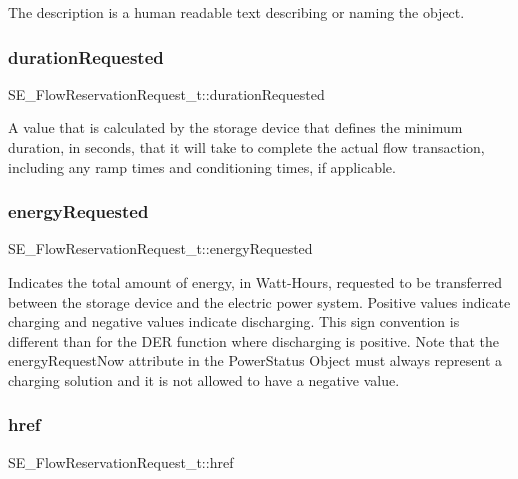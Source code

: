 The description is a human readable text describing or naming the object. \mbox{\label{group__FlowReservationRequest_gae84ba3c66b07ed3f5b9e567893c0796a}} 
\subsubsection{\texorpdfstring{duration\+Requested}{durationRequested}}
{\footnotesize\ttfamily S\+E\+\_\+\+Flow\+Reservation\+Request\+\_\+t\+::duration\+Requested}

A value that is calculated by the storage device that defines the minimum duration, in seconds, that it will take to complete the actual flow transaction, including any ramp times and conditioning times, if applicable. \mbox{\label{group__FlowReservationRequest_ga02b7ef2f402468e92c66728984b2b0c8}} 
\subsubsection{\texorpdfstring{energy\+Requested}{energyRequested}}
{\footnotesize\ttfamily S\+E\+\_\+\+Flow\+Reservation\+Request\+\_\+t\+::energy\+Requested}

Indicates the total amount of energy, in Watt-\/\+Hours, requested to be transferred between the storage device and the electric power system. Positive values indicate charging and negative values indicate discharging. This sign convention is different than for the D\+ER function where discharging is positive. Note that the energy\+Request\+Now attribute in the Power\+Status Object must always represent a charging solution and it is not allowed to have a negative value. \mbox{\label{group__FlowReservationRequest_ga26db6aba32274d08e0038686ec6ae177}} 
\subsubsection{\texorpdfstring{href}{href}}
{\footnotesize\ttfamily S\+E\+\_\+\+Flow\+Reservation\+Request\+\_\+t\+::href}

